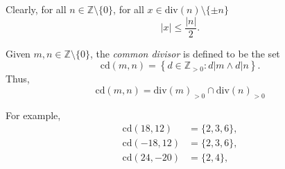 Clearly, for all $n \in \mathbb Z \setminus \{0\}$, for all $x \in \mathrm{div}(n) \setminus \{\pm n\}$
$$
|x| \le \frac{|n|}{2}.
$$

\begin{definition}
	Given $m, n \in \mathbb Z \setminus \{0\}$, the \textit{common divisor} is defined to be the set
	$$
	\mathrm{cd}(m,n) = \left\{ d \in \mathbb Z_{> 0} : d|m \land d|n \right\}.
	$$
	Thus,
	$$
	\mathrm{cd}(m,n) = \mathrm{div}(m)_{> 0} \cap \mathrm{div}(n)_{>0}
	$$
\end{definition}


For example,
$$
\begin{aligned}
	\mathrm{cd}(18, 12) &= \{ 2, 3, 6 \}, \\
	\mathrm{cd}(-18, 12) &= \{ 2, 3, 6 \}, \\
	\mathrm{cd}(24, -20) &= \{ 2, 4 \},
\end{aligned}
$$























%